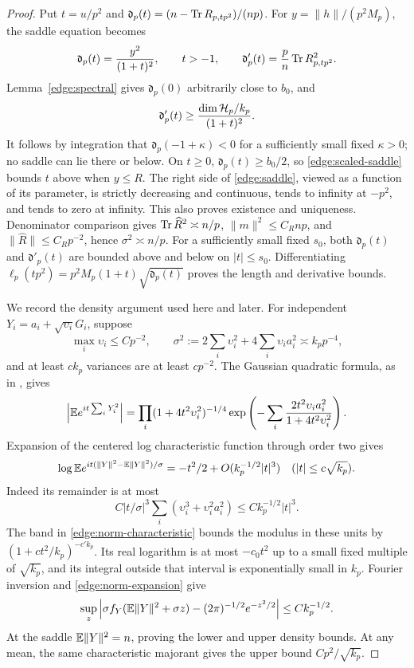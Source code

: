 \begin{proof}
Put \(t=u/p^2\) and
\(\mathfrak d_p(t)=(n-\operatorname{Tr} R_{p,tp^2})/(np)\).
For \(y=\|h\|/(p^2M_p)\), the saddle equation becomes
\begin{equation}\label{edge:scaled-saddle}
 \mathfrak d_p(t)=\frac{y^2}{(1+t)^2},\qquad t>-1,\qquad
 \mathfrak d'_p(t)=\frac p n\operatorname{Tr} R_{p,tp^2}^2.
\end{equation}
Lemma~\ref{edge:spectral} gives \(\mathfrak d_p(0)\) arbitrarily close
to \(b_0\), and
\[
 \mathfrak d'_p(t)\ge
       \frac{\dim\mathcal H_p/k_p}{(1+t)^2}.
\]
It follows by integration that
\(\mathfrak d_p(-1+\kappa)<0\) for a sufficiently small fixed
\(\kappa>0\); no saddle can lie there or below.  On \(t\ge0\),
\(\mathfrak d_p(t)\ge b_0/2\), so \eqref{edge:scaled-saddle} bounds
\(t\) above when \(y\le R\).  The right side of \eqref{edge:saddle},
viewed as a function of its parameter, is strictly decreasing and
continuous, tends to infinity at \(-p^2\), and tends to zero at infinity.
This also proves existence and uniqueness.  Denominator comparison gives
\(\operatorname{Tr}\widehat R^2\asymp n/p\), \(\|m\|^2\le C_Rnp\), and
\(\|\widehat R\|\le C_Rp^{-2}\), hence \(\sigma^2\asymp n/p\).
For a sufficiently small fixed \(s_0\), both
\(\mathfrak d_p(t)\) and \(\mathfrak d'_p(t)\) are bounded above and
below on \(|t|\le s_0\).  Differentiating
\(\ell_p(tp^2)=p^2M_p(1+t)\sqrt{\mathfrak d_p(t)}\) proves the length
and derivative bounds.

We record the density argument used here and later.  For independent
\(Y_i=a_i+\sqrt{\upsilon_i}G_i\), suppose
\[
 \max_i\upsilon_i\le Cp^{-2},\qquad
 \sigma^2:=2\sum_i\upsilon_i^2+4\sum_i\upsilon_i a_i^2
       \asymp k_pp^{-4},
\]
and at least \(ck_p\) variances are at least \(cp^{-2}\).  The Gaussian
quadratic formula, as in \cite[Section~15.3, Equation~(15.5)]{CM}, gives
\begin{equation}\label{edge:norm-characteristic}
 \left|\mathbb E e^{it\sum_iY_i^2}\right|
 =\prod_i(1+4t^2\upsilon_i^2)^{-1/4}
   \exp\left(-\sum_i
       \frac{2t^2\upsilon_i a_i^2}{1+4t^2\upsilon_i^2}\right).
\end{equation}
Expansion of the centered log characteristic function through order two
gives
\begin{equation}\label{edge:norm-expansion}
 \log\mathbb E e^{it(\|Y\|^2-\mathbb E\|Y\|^2)/\sigma}
       =-t^2/2+O(k_p^{-1/2}|t|^3)
       \quad (|t|\le c\sqrt{k_p}).
\end{equation}
Indeed its remainder is at most
\[
 C|t/\sigma|^3\sum_i(\upsilon_i^3+\upsilon_i^2a_i^2)
       \le Ck_p^{-1/2}|t|^3.
\]
The band in \eqref{edge:norm-characteristic} bounds the modulus in these
units by \((1+ct^2/k_p)^{-c'k_p}\).  Its real logarithm is at most
\(-c_0t^2\) up to a small fixed multiple of \(\sqrt{k_p}\), and its
integral outside that interval is exponentially small in \(k_p\).
Fourier inversion and \eqref{edge:norm-expansion} give
\begin{equation}\label{edge:norm-local-limit}
 \sup_z\left|\sigma f_Y(\mathbb E\|Y\|^2+\sigma z)
       -(2\pi)^{-1/2}e^{-z^2/2}\right|\le Ck_p^{-1/2}.
\end{equation}
At the saddle \(\mathbb E\|Y\|^2=n\), proving the lower and upper density bounds.
At any mean, the same characteristic majorant gives the upper bound
\(Cp^2/\sqrt{k_p}\).


\end{proof}
